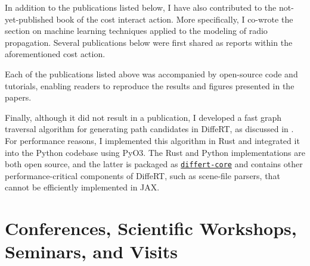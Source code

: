 In addition to the publications listed below, I have also contributed to the not-yet-published book of the \gls{cost} \gls{interact} action. More specifically, I co-wrote the section on machine learning techniques applied to the modeling of radio propagation. Several publications below were first shared as reports within the aforementioned \gls{cost} action.

\begin{refsection}
  \nocite{Eertmans2026NPJWT,Eertmans2026EuCAP,Eertmans2025ICMLCN,Eertmans2025ICMLCNDemo,Eertmans2025EuCAP,Eertmans2024EuCAP,Eertmans2023EuCAP,Eertmans2023JOSE,Eertmans2024JOSS}

  {

    \printbibliography[heading=pubtype,title={\faBook{}\,{Preprints}},type=unpublished]

    \printbibliography[heading=pubtype,title={\faUsers{}\,{Conference Proceedings}},type=inproceedings]

    \printbibliography[heading=pubtype,title={\faFile*[regular]{}\,{Journal Articles}},type=article]
  }

  Each of the publications listed above was accompanied by open-source code and tutorials, enabling readers to reproduce the results and figures presented in the papers.

  Finally, although it did not result in a publication, I developed a fast graph traversal algorithm for generating path candidates in DiffeRT, as discussed in . For performance reasons, I implemented this algorithm in Rust and integrated it into the Python codebase using PyO3. The Rust and Python implementations are both open source, and the latter is packaged as \href{https://pypi.org/project/differt-core/}{\texttt{differt-core}} and contains other performance-critical components of DiffeRT, such as scene-file parsers, that cannot be efficiently implemented in JAX.

  \section{Conferences, Scientific Workshops, Seminars, and Visits}


\end{refsection}

